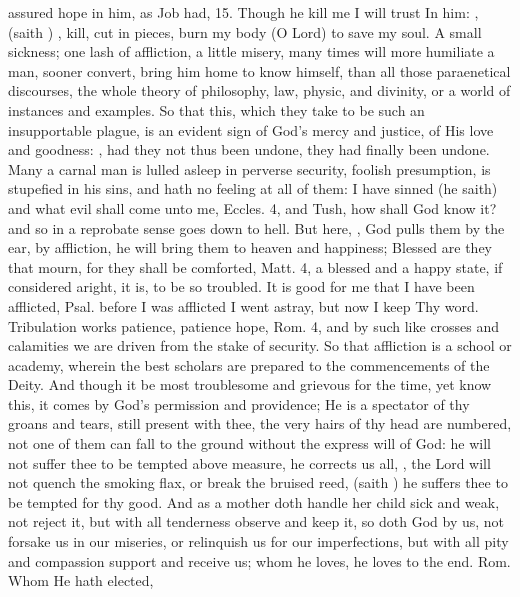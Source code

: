 {assured hope in him, as Job had,  15. Though he kill me I will
trust In him: , (saith \Austin{}) , kill, cut in pieces, burn my body (O Lord) to save my soul. A
small sickness; one lash of affliction, a little misery, many times
will more humiliate a man, sooner convert, bring him home to know
himself, than all those paraenetical discourses, the whole theory of
philosophy, law, physic, and divinity, or a world of instances and
examples. So that this, which they take to be such an insupportable
plague, is an evident sign of God's mercy and justice, of His love and
goodness: , had they not thus been undone,
they had finally been undone. Many a carnal man is lulled asleep in
perverse security, foolish presumption, is stupefied in his sins, and
hath no feeling at all of them: I have sinned (he saith) and what evil
shall come unto me, Eccles.  4, and Tush, how shall God know it? and
so in a reprobate sense goes down to hell. But here, , God pulls them by the ear, by affliction, he will bring them to
heaven and happiness; Blessed are they that mourn, for they shall be
comforted, Matt.  4, a blessed and a happy state, if considered
aright, it is, to be so troubled. It is good for me that I have been
afflicted, Psal.  before I was afflicted I went astray, but now I
keep Thy word. Tribulation works patience, patience hope, Rom.  4,
and by such like crosses and calamities we are driven from the stake of
security. So that affliction is a school or academy, wherein the best
scholars are prepared to the commencements of the Deity. And though it
be most troublesome and grievous for the time, yet know this, it comes
by God's permission and providence; He is a spectator of thy groans and
tears, still present with thee, the very hairs of thy head are
numbered, not one of them can fall to the ground without the express
will of God: he will not suffer thee to be tempted above measure, he
corrects us all, , the Lord will not
quench the smoking flax, or break the bruised reed,  (saith
\Austin{})  he suffers thee to be tempted for
thy good. And as a mother doth handle her child sick and weak, not
reject it, but with all tenderness observe and keep it, so doth God by
us, not forsake us in our miseries, or relinquish us for our
imperfections, but with all pity and compassion support and receive us;
whom he loves, he loves to the end. Rom.  Whom He hath elected,
}
